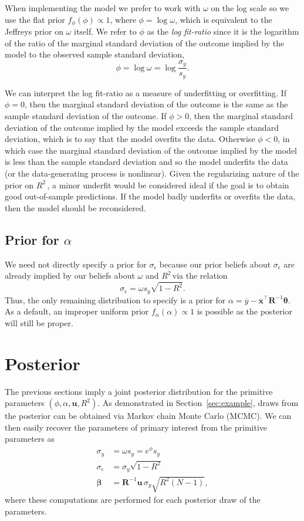 \documentclass[11pt]{article}
\newcommand{\Rsq}{$R^2\,$}
\newcommand{\boldbeta}{\boldsymbol{\beta}}
\newcommand{\boldtheta}{\boldsymbol{\theta}}
\newcommand{\sigmaEps}{\sigma_{\epsilon}}
\newcommand{\R}{\mathbf{R}}
\renewcommand{\u}{\mathbf{u}}
\begin{document}
When implementing the model we prefer to work with $\omega$ on the log scale
so we use the flat prior $f_\phi(\phi) \propto 1$, where $\phi =
\log{\omega}$, which is equivalent to the Jeffreys prior on $\omega$ itself. We
refer to $\phi$ as the \emph{log fit-ratio} since it is the logarithm of the
ratio of the marginal standard deviation of the outcome implied by the model to
the observed sample standard deviation,
%
$$\phi = \log{\omega} = \log{\frac{\sigma_y}{s_y}}.$$

We can interpret the log fit-ratio as a measure of underfitting or overfitting.
If $\phi = 0$, then the marginal standard deviation of the outcome is the same
as the sample standard deviation of the outcome. If $\phi > 0$, then the
marginal standard deviation of the outcome implied by the model exceeds the
sample standard deviation, which is to say that the model overfits the data.
Otherwise $\phi < 0$, in which case the marginal standard deviation of the
outcome implied by the model is less than the sample standard deviation and so
the model underfits the data (or the data-generating process is nonlinear).
Given the regularizing nature of the prior on \Rsq, a minor underfit would be
considered ideal if the goal is to obtain good out-of-sample predictions. If the
model badly underfits or overfits the data, then the model should be
reconsidered.

\subsection{Prior for $\alpha$}
We need not directly specify a prior for $\sigmaEps$ because our prior beliefs
about $\sigmaEps$ are already implied by our beliefs about $\omega$ and \Rsq via
the relation
$$\sigmaEps = \omega s_y \sqrt{1 - R^2}.$$
Thus, the only remaining distribution to specify is a prior for
$\alpha = \overline{y} - \overline{\mathbf{x}}^\top \R^{-1} \boldtheta$.
As a default, an improper uniform prior $f_\alpha(\alpha) \propto 1$ is possible
as the posterior will still be proper.

\section{Posterior}
\label{sec:posterior}

The previous sections imply a joint posterior distribution for the primitive
parameters $\left(\phi, \alpha, \u, R^2 \right)$. As demonstrated in
Section~\ref{sec:example}, draws from the posterior can be obtained via Markov
chain Monte Carlo (MCMC). We can then easily recover the parameters of primary
interest from the primitive parameters as
%
\begin{align*}
\sigma_y &= \omega s_y = e^\phi s_y \\
\sigmaEps &= \sigma_y \sqrt{1 - R^2} \\
\boldbeta &= \R^{-1} \u \, \sigma_y \sqrt{R^2 \left(N-1\right)},
\end{align*}
%
where these computations are performed for each posterior draw of the
parameters.
\end{document}
